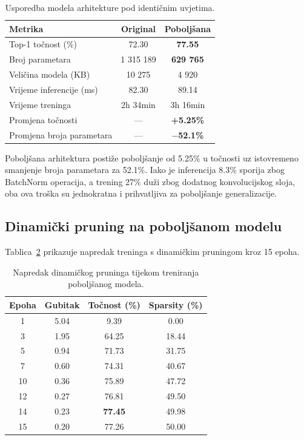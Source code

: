 \documentclass[letterpaper, 10 pt, conference]{ieeeconf}
\begin{document}
\begin{table}[h]
\caption{Usporedba modela arhitekture pod identičnim uvjetima.}
\label{tab:v1_vs_v2}
\begin{center}
\begin{tabular}{lcc}
\toprule
\textbf{Metrika} & \textbf{Original} & \textbf{Poboljšana} \\
\midrule
Top-1 točnost (\%)     & 72.30  & \textbf{77.55} \\
Broj parametara        & 1 315 189 & \textbf{629 765} \\
Veličina modela (KB)   & 10 275  & 4 920 \\
Vrijeme inferencije (ms) & 82.30 & 89.14 \\
Vrijeme treninga       & 2h 34min & 3h 16min \\
\midrule
Promjena točnosti      & --- & \textbf{+5.25\%} \\
Promjena broja parametara & --- & \textbf{$-$52.1\%} \\
\bottomrule
\end{tabular}
\end{center}
\end{table}

Poboljšana arhitektura postiže poboljšanje od 5.25\% u točnosti uz istovremeno smanjenje broja parametara za 52.1\%.
Iako je inferencija 8.3\% sporija zbog BatchNorm operacija, a trening 27\% duži zbog dodatnog konvolucijskog sloja, oba ova troška su jednokratna i prihvatljiva za poboljšanje generalizacije.

\subsection{Dinamički pruning na poboljšanom modelu}

Tablica~\ref{tab:pruning_progress} prikazuje napredak treninga s dinamičkim pruningom kroz 15 epoha.

\begin{table}[h]
\caption{Napredak dinamičkog pruninga tijekom treniranja poboljšanog modela.}
\label{tab:pruning_progress}
\begin{center}
\begin{tabular}{cccc}
\toprule
\textbf{Epoha} & \textbf{Gubitak} & \textbf{Točnost (\%)} & \textbf{Sparsity (\%)} \\
\midrule
1   & 5.04 &  9.39 & 0.00 \\
3   & 1.95 & 64.25 & 18.44 \\
5   & 0.94 & 71.73 & 31.75 \\
7   & 0.60 & 74.31 & 40.67 \\
10  & 0.36 & 75.89 & 47.72 \\
12  & 0.27 & 76.81 & 49.50 \\
14  & 0.23 & \textbf{77.45} & 49.98 \\
15  & 0.20 & 77.26 & 50.00 \\
\bottomrule
\end{tabular}
\end{center}
\end{table}
\end{document}
